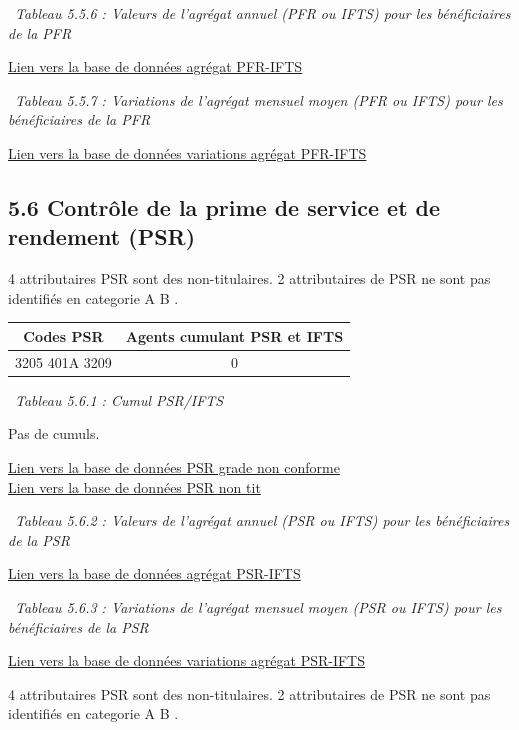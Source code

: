 ~\emph{Tableau 5.5.6 : Valeurs de l'agrégat annuel (PFR ou IFTS) pour
les bénéficiaires de la PFR}

\href{../Bases/Remunerations/beneficiaires.PFR.IFTS.csv}{Lien vers la base
de données agrégat PFR-IFTS}

~\emph{Tableau 5.5.7 : Variations de l'agrégat mensuel moyen (PFR ou
IFTS) pour les bénéficiaires de la PFR}

\href{../Bases/Remunerations/beneficiaires.PFR.IFTS.Variation.csv}{Lien
vers la base de données variations agrégat PFR-IFTS}

\hypertarget{controle-de-la-prime-de-service-et-de-rendement-psr}{%
\subsection{5.6 Contrôle de la prime de service et de rendement
(PSR)}\label{controle-de-la-prime-de-service-et-de-rendement-psr}}

4 attributaires PSR sont des non-titulaires. 2 attributaires de PSR ne
sont pas identifiés en categorie A B .

\begin{longtable}[]{@{}cc@{}}
\toprule
Codes PSR & Agents cumulant PSR et IFTS\tabularnewline
\midrule
\endhead
3205 401A 3209 & 0\tabularnewline
\bottomrule
\end{longtable}

~\emph{Tableau 5.6.1 : Cumul PSR/IFTS}

Pas de cumuls.

\href{../Bases/Reglementation/PSR.non.catAB.csv}{Lien vers la base de
données PSR grade non conforme}\\
\href{../Bases/Reglementation/PSR.non.tit.csv}{Lien vers la base de données
PSR non tit}

~\emph{Tableau 5.6.2 : Valeurs de l'agrégat annuel (PSR ou IFTS) pour
les bénéficiaires de la PSR}

\href{../Bases/Remunerations/beneficiaires.PSR.IFTS.csv}{Lien vers la base
de données agrégat PSR-IFTS}

~\emph{Tableau 5.6.3 : Variations de l'agrégat mensuel moyen (PSR ou
IFTS) pour les bénéficiaires de la PSR}

\href{../Bases/Remunerations/beneficiaires.PSR.IFTS.Variation.csv}{Lien
vers la base de données variations agrégat PSR-IFTS}

4 attributaires PSR sont des non-titulaires. 2 attributaires de PSR ne
sont pas identifiés en categorie A B .

